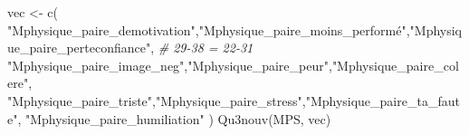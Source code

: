 \documentclass[
]{article}
\newenvironment{Shaded}{\begin{snugshade}}{\end{snugshade}}
\newcommand{\CommentTok}[1]{\textcolor[rgb]{0.56,0.35,0.01}{\textit{#1}}}
\newcommand{\FunctionTok}[1]{\textcolor[rgb]{0.00,0.00,0.00}{#1}}
\newcommand{\NormalTok}[1]{#1}
\newcommand{\OtherTok}[1]{\textcolor[rgb]{0.56,0.35,0.01}{#1}}
\newcommand{\StringTok}[1]{\textcolor[rgb]{0.31,0.60,0.02}{#1}}
\begin{document}
\begin{Shaded}
\begin{Highlighting}[]
\NormalTok{vec }\OtherTok{\textless{}{-}} \FunctionTok{c}\NormalTok{(}
    \StringTok{"Mphysique\_paire\_demotivation"}\NormalTok{,}\StringTok{"Mphysique\_paire\_moins\_performé"}\NormalTok{,}\StringTok{"Mphysique\_paire\_perteconfiance"}\NormalTok{,  }\CommentTok{\# 29{-}38 = 22{-}31}
    \StringTok{"Mphysique\_paire\_image\_neg"}\NormalTok{,}\StringTok{"Mphysique\_paire\_peur"}\NormalTok{,}\StringTok{"Mphysique\_paire\_colere"}\NormalTok{,}
     \StringTok{"Mphysique\_paire\_triste"}\NormalTok{,}\StringTok{"Mphysique\_paire\_stress"}\NormalTok{,}\StringTok{"Mphysique\_paire\_ta\_faute"}\NormalTok{,}
     \StringTok{"Mphysique\_paire\_humiliation"}  
\NormalTok{     )}
\FunctionTok{Qu3nouv}\NormalTok{(MPS, vec)}
\end{Highlighting}
\end{Shaded}
\end{document}
